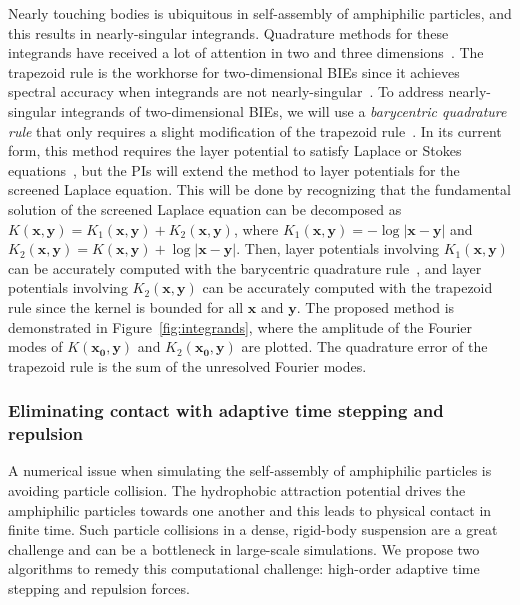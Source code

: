 Nearly touching bodies is ubiquitous in self-assembly of amphiphilic
particles, and this results in nearly-singular integrands. Quadrature
methods for these integrands have received a lot of attention in two and
three dimensions~\cite{alpert, kapur, sidi, duffy, bruno1, bruno2,
davis_1984, graglia_2008, hackbusch_sauter_1994, jarvenpaa_2003,
khayat_2005, schwab_1992, ying_2006, beale1, schwab_1992, ggq1, ggq2,
ggq3, helsing_2008a, helsing_tutorial_2012, klockner2013jcp, qbx2,
wala2019jcp, af2018sisc, siegel2018jcp, rachh2017jcp, ding2019arxiv,
bar2014}. The trapezoid rule is the workhorse for two-dimensional BIEs
since it achieves spectral accuracy when integrands are not
nearly-singular~\cite{tre-wei2014}. To address nearly-singular
integrands of two-dimensional BIEs, we will use a {\em barycentric
quadrature rule} that only requires a slight modification of the
trapezoid rule~\cite{ioa-pap-per1991}. In its current form, this method
requires the layer potential to satisfy Laplace or Stokes
equations~\cite{bar-wu-vee2015, chi-moo-qua2020}, but the PIs will
extend the method to layer potentials for the screened Laplace equation.
This will be done by recognizing that the fundamental solution of the
screened Laplace equation can be decomposed as $K(\mathbf{x},\mathbf{y})
= K_1(\mathbf{x},\mathbf{y}) + K_2(\mathbf{x},\mathbf{y})$, where
$K_1(\mathbf{x},\mathbf{y}) = -\log|\mathbf{x} - \mathbf{y}|$ and
$K_2(\mathbf{x},\mathbf{y}) = K(\mathbf{x},\mathbf{y}) + \log|\mathbf{x}
- \mathbf{y}|$. Then, layer potentials involving
$K_1(\mathbf{x},\mathbf{y})$ can be accurately computed with the
barycentric quadrature rule~\cite{ioa-pap-per1991}, and layer potentials
involving $K_2(\mathbf{x},\mathbf{y})$ can be accurately computed with
the trapezoid rule since the kernel is bounded for all $\mathbf{x}$ and
$\mathbf{y}$. The proposed method is demonstrated in
Figure~\ref{fig:integrands}, where the amplitude of the Fourier modes of
$K(\mathbf{x_0},\mathbf{y})$ and $K_2(\mathbf{x_0},\mathbf{y})$ are
plotted. The quadrature error of the trapezoid rule is the sum of the
unresolved Fourier modes.


\subsubsection{Eliminating contact with adaptive time stepping and
repulsion}
\label{subsec:timeStepping}

A numerical issue when simulating the self-assembly of amphiphilic
particles is avoiding particle collision. The hydrophobic attraction
potential drives the amphiphilic particles towards one another and
this leads to physical contact in
finite time. Such particle collisions in a dense, rigid-body suspension
are a great challenge and can be a bottleneck in large-scale simulations.
We propose two algorithms to remedy this computational challenge:
high-order adaptive time stepping and repulsion forces.

